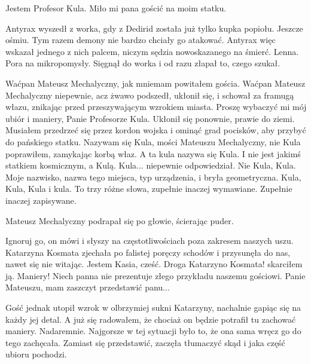 \begin{dialogue}
\ds{} Jestem Profesor Kula. Miło mi pana gościć na moim statku.
\end{dialogue}

\divider{}

Antyrax wyszedł z worka, gdy z Dedirid została już tylko kupka popiołu.
Jeszcze ośmiu.
Tym razem demony nie bardzo chciały go atakować.
Antyrax więc wskazał jednego z nich palcem, niczym sędzia nowoskazanego na śmierć.
Lenna. Pora na mikropomysły.
Sięgnął do worka i od razu złapał to, czego szukał.

\divider{}

\begin{dialogue}
\ds{} Waćpan Mateusz Mechalyczny, jak mniemam \dm{} powitałem gościa. \dm{} Waćpan Mateusz Mechalyczny niepewnie, acz żwawo podszedł, ukłonił się, i schował za framugą włazu,
znikając przed przeszywającym wzrokiem miasta.
\ds{} Proszę wybaczyć mi mój ubiór i maniery, Panie Profesorze Kula. \dm{} Ukłonił się ponownie, prawie do ziemi. \dm{}
Musiałem przedrzeć się przez kordon wojska i ominąć grad pocisków, aby przybyć do pańskiego statku.
\ds{} Nazywam się Kula, mości Mateuszu Mechalyczny, nie Kula \dm{} poprawiłem, zamykając korbą właz. \dm{} A ta kula nazywa się Kula. 
I nie jest jakimś statkiem kosmicznym, a Kulą.
\ds{} Kula... \dm{} niepewnie odpowiedział.
\ds{} Nie Kula, Kula. Moje nazwisko, nazwa tego miejsca, typ urządzenia, i bryła geometryczna. Kula, Kula, Kula i kula. To trzy różne słowa, zupełnie inaczej wymawiane.
Zupełnie inaczej zapisywane.
\end{dialogue}

Mateusz Mechalyczny podrapał się po głowie, ścierając puder.

\begin{dialogue}
\ds{} Ignoruj go, on mówi i słyszy na częstotliwościach poza zakresem naszych uszu. \dm{} Katarzyna Kosmata zjechała po falistej poręczy schodów i przysunęła do nas, nawet się nie witając.
\dm{} Jestem Kasia, cześć.
\ds{} Droga Katarzyno Kosmata! \dm{} skarciłem ją. \dm{} Maniery! Niech panna nie prezentuje złego przykładu naszemu gościowi. Panie Mateuszu, mam zaszczyt przedstawić panu...
\end{dialogue}

Gość jednak utopił wzrok w olbrzymiej sukni Katarzyny, nachalnie gapiąc się na każdy jej detal.
A już się radowałem, że chociaż on będzie potrafił tu zachować maniery. Nadaremnie.
Najgorsze w tej sytuacji było to, że ona sama wręcz go do tego zachęcała. 
Zamiast się przedstawić, zaczęła tłumaczyć skąd i jaka część ubioru pochodzi.

